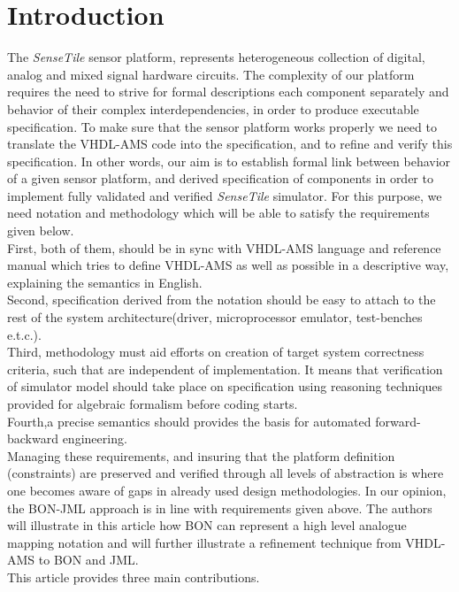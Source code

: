 \documentclass{article}
\newcommand{\ST}{\emph{SenseTile}\xspace}
\begin{document}
\section{Introduction}
\label{sec:introduction}
The \ST sensor platform, represents heterogeneous 
collection of digital, analog and mixed signal hardware circuits. 
The complexity of our platform requires the need to strive for formal 
descriptions each component separately and  behavior of their 
complex interdependencies, in order to produce executable specification.
To make sure that the sensor platform works properly we need 
to translate the VHDL-AMS code into the specification, and to refine and 
verify this specification.
In other words, our aim is to establish formal link between behavior of a given 
sensor platform, and derived specification of components  in order to implement 
fully validated and verified \ST simulator.
For this purpose, we need notation and methodology 
which will be able to satisfy the requirements given below.\\ 
First, both of them, should be in sync with  VHDL-AMS language and reference 
manual which tries to define VHDL-AMS as well as possible in a descriptive way,
explaining the semantics in English.\\
Second, specification derived from the notation should  be easy to attach to 
the rest of the system architecture\xspace(driver, microprocessor emulator, 
test-benches e.t.c.).\\
Third, methodology must aid efforts on creation of target system 
correctness criteria, such that are independent of implementation.
It means that verification of simulator model should take place on specification 
using reasoning techniques provided for algebraic formalism before coding starts.\\
Fourth,a precise semantics should  provides the basis for
automated forward-backward engineering.\\
Managing these requirements, and insuring that the platform definition 
(constraints) are preserved and verified through all levels of 
abstraction is where one becomes aware of gaps in already 
used design methodologies.
In our opinion, the BON-JML approach is in line with requirements given above.
The authors will illustrate in this article how BON can represent a high
level analogue mapping notation and will further illustrate a refinement 
technique from VHDL-AMS to BON and JML.\\
This article provides three main contributions.
\end{document}
